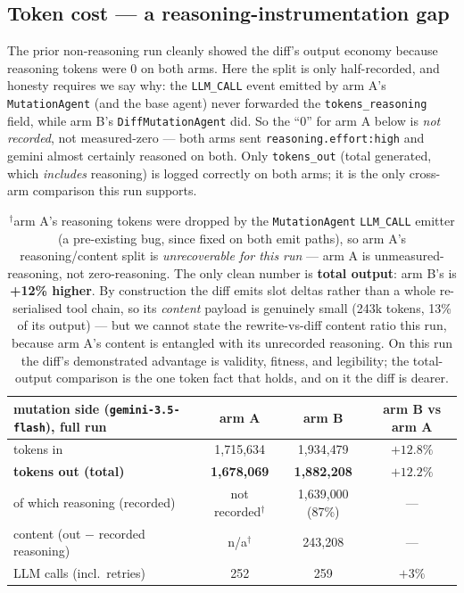 \documentclass[11pt]{article}
\newcommand{\armA}{\textcolor{bad}{arm A}}
\newcommand{\armB}{\textcolor{accent}{arm B}}
\begin{document}
\subsection{Token cost --- a reasoning-instrumentation gap}
\label{sec:tokens}
The prior non-reasoning run cleanly showed the diff's output economy because reasoning tokens
were 0 on both arms. Here the split is only half-recorded, and honesty requires we say why: the
\texttt{LLM\_CALL} event emitted by \armA's \texttt{MutationAgent} (and the base agent) never
forwarded the \texttt{tokens\_reasoning} field, while \armB's \texttt{DiffMutationAgent} did. So
the ``0'' for \armA{} below is \emph{not recorded}, not measured-zero --- both arms sent
\texttt{reasoning.effort:high} and gemini almost certainly reasoned on both. Only
\texttt{tokens\_out} (total generated, which \emph{includes} reasoning) is logged correctly on
both arms; it is the only cross-arm comparison this run supports.
\begin{table}[H]\centering
\begin{tabular}{lccc}
\toprule
mutation side (\texttt{gemini-3.5-flash}), full run & \armA{} & \armB{} & \armB{} vs \armA{} \\
\midrule
tokens in & 1{,}715{,}634 & 1{,}934{,}479 & $+12.8\%$ \\
\textbf{tokens out (total)} & \textbf{1{,}678{,}069} & \textbf{1{,}882{,}208} & \textbf{$+12.2\%$} \\
\quad of which reasoning (recorded) & \textcolor{bad}{not recorded$^\dagger$} & 1{,}639{,}000 (87\%) & --- \\
\quad content (out $-$ recorded reasoning) & \textcolor{bad}{n/a$^\dagger$} & 243{,}208 & --- \\
LLM calls (incl.\ retries) & 252 & 259 & $+3\%$ \\
\bottomrule
\end{tabular}
\caption{$^\dagger$\armA's reasoning tokens were dropped by the \texttt{MutationAgent}
\texttt{LLM\_CALL} emitter (a pre-existing bug, since fixed on both emit paths), so \armA's
reasoning/content split is \emph{unrecoverable for this run} --- \armA{} is unmeasured-reasoning,
not zero-reasoning. The only clean number is \textbf{total output}: \armB's is
\textbf{+12\% higher}. By construction the diff emits slot deltas rather than a whole
re-serialised tool chain, so its \emph{content} payload is genuinely small (243k tokens, 13\% of
its output) --- but we cannot state the rewrite-vs-diff content ratio this run, because \armA's
content is entangled with its unrecorded reasoning. On this run the diff's demonstrated advantage
is validity, fitness, and legibility; the total-output comparison is the one token fact that
holds, and on it the diff is dearer.}
\end{table}
\end{document}
